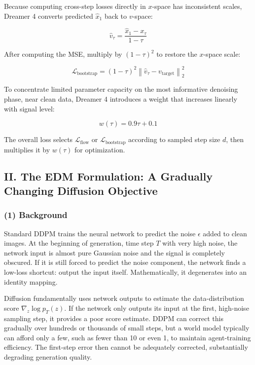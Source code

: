 Because computing cross-step losses directly in \(x\)-space has inconsistent scales, Dreamer 4 converts predicted \(\hat{x}_1\) back to \(v\)-space:

\[
\hat{v}_\tau=\frac{\hat{x}_1-x_\tau}{1-\tau}
\]

After computing the MSE, multiply by \((1-\tau)^2\) to restore the \(x\)-space scale:

\[
\mathcal{L}_{\mathrm{bootstrap}}=(1-\tau)^2\left\|\hat{v}_\tau-v_{\mathrm{target}}\right\|_2^2
\]

To concentrate limited parameter capacity on the most informative denoising phase, near clean data, Dreamer 4 introduces a weight that increases linearly with signal level:

\[
w(\tau)=0.9\tau+0.1
\]

The overall loss selects \(\mathcal{L}_{\mathrm{flow}}\) or \(\mathcal{L}_{\mathrm{bootstrap}}\) according to sampled step size \(d\), then multiplies it by \(w(\tau)\) for optimization.

\hypertarget{ii.-the-edm-formulation-a-gradually-changing-diffusion-objective}{%
\subsection{II. The EDM Formulation: A Gradually Changing Diffusion Objective}\label{ii.-the-edm-formulation-a-gradually-changing-diffusion-objective}}

\hypertarget{background-2}{%
\subsubsection{(1) Background}\label{background-2}}

Standard DDPM trains the neural network to predict the noise \(\epsilon\) added to clean images. At the beginning of generation, time step \(T\) with very high noise, the network input is almost pure Gaussian noise and the signal is completely obscured. If it is still forced to predict the noise component, the network finds a low-loss shortcut: output the input itself. Mathematically, it degenerates into an identity mapping.

Diffusion fundamentally uses network outputs to estimate the data-distribution score \(\nabla_z\log p_T(z)\). If the network only outputs its input at the first, high-noise sampling step, it provides a poor score estimate. DDPM can correct this gradually over hundreds or thousands of small steps, but a world model typically can afford only a few, such as fewer than 10 or even 1, to maintain agent-training efficiency. The first-step error then cannot be adequately corrected, substantially degrading generation quality.

